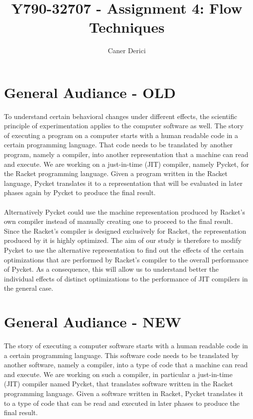 \documentclass{article}
\title{Y790-32707 - Assignment 4: Flow Techniques}
\author{}
\date{Caner Derici}
\begin{document}

\maketitle%

\section{General Audiance - OLD}

\paragraph{} To understand certain behavioral changes under different effects, the
scientific principle of experimentation applies to the computer
software as well. The story of executing a program on a computer
starts with a human readable code in a certain programming
language. That code needs to be translated by another program, namely
a compiler, into another representation that a machine can read and
execute. We are working on a just-in-time (JIT) compiler, namely
Pycket, for the Racket programming language. Given a program written
in the Racket language, Pycket translates it to a representation that
will be evaluated in later phases again by Pycket to produce the final
result.

\paragraph{} Alternatively Pycket could use the machine representation
produced by Racket's own compiler instead of manually creating one to
proceed to the final result. Since the Racket's compiler is designed
exclusively for Racket, the representation produced by it is highly
optimized. The aim of our study is therefore to modify Pycket to use
the alternative representation to find out the effects of the certain
optimizations that are performed by Racket's compiler to the overall
performance of Pycket. As a consequence, this will allow us to
understand better the individual effects of distinct optimizations to
the performance of JIT compilers in the general case.

\section{General Audiance - NEW}

\paragraph{} The story of executing a computer software starts with a human
readable code in a certain programming language. This software code
needs to be translated by another software, namely a compiler, into a
type of code that a machine can read and execute. We are working on
such a compiler, in particular a just-in-time (JIT) compiler named
Pycket, that translates software written in the Racket programming
language. Given a software written in Racket, Pycket translates it to
a type of code that can be read and executed in later phases to
produce the final result.
\end{document}
